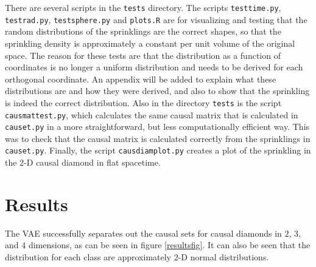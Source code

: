 \documentclass[letterpaper,10pt]{article}
\def\code#1{\texttt{#1}}
\begin{document}
There are several scripts in the \code{tests} directory.  The scripts \code{testtime.py}, \code{testrad.py}, \code{testsphere.py} and \code{plots.R} 
are for visualizing and testing that the random distributions of the sprinklings 
are the correct shapes, so that the sprinkling density is approximately a constant per unit volume of the original space.  The reason for these tests 
are that the distribution as a function of coordinates is no longer a uniform distribution and needs to be derived for each orthogonal coordinate.  
An appendix will be added to explain what these distributions are and how they were derived, and also to show that the sprinkling is indeed the correct 
distribution.  Also in the directory \code{tests} is the script \code{causmattest.py}, which calculates the same causal matrix that is calculated in 
\code{causet.py} in a more straightforward, but less computationally efficient way.  This was to check that the causal matrix is calculated correctly 
from the sprinklings in \code{causet.py}.  Finally, the script \code{causdiamplot.py} creates a plot of the sprinkling in the 2-D causal diamond in flat 
spacetime.


\section{Results} \label{results}

The VAE successfully separates out the causal sets for causal diamonds in $2$, $3$, and $4$ dimensions, as can be seen in figure \ref{resultsfig}.  
It can also be seen that the distribution for each class are approximately $2$-D normal distributions.
\end{document}
